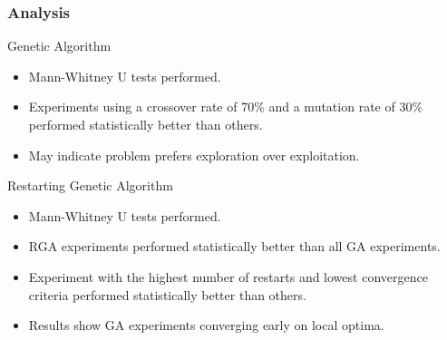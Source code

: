 \documentclass[10pt]{beamer}
\begin{document}



\begin{frame}
	\frametitle{Analysis}

	Genetic Algorithm

	\begin{itemize}
		\item Mann-Whitney U tests performed.
		\item Experiments using a crossover rate of 70\% and a mutation rate of 30\% performed statistically better than others.
		\item May indicate problem prefers exploration over exploitation.
	\end{itemize}

	Restarting Genetic Algorithm
	
	\begin{itemize}
		\item Mann-Whitney U tests performed.
		\item RGA experiments performed statistically better than all GA experiments.
		\item Experiment with the highest number of restarts and lowest convergence criteria performed statistically better than others.
		\item Results show GA experiments converging early on local optima.
	\end{itemize}

\end{frame}
\end{document}

